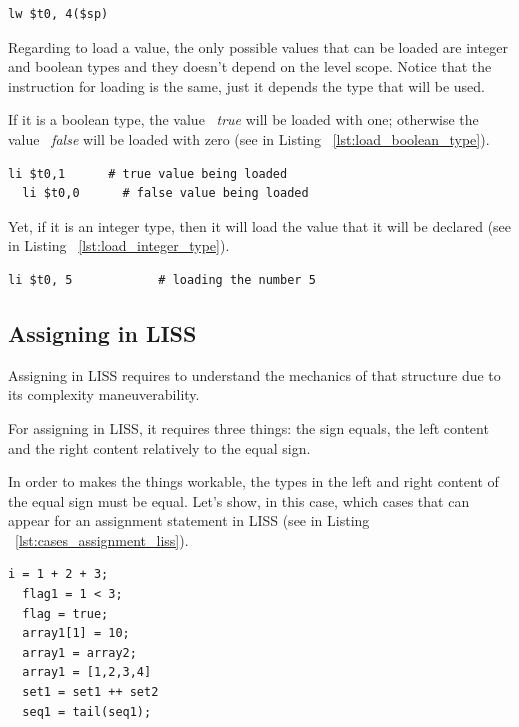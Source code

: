 \documentclass[
  oneside,
  11pt, a4paper,
  footinclude=true,
  headinclude=true,
  cleardoublepage=empty
]{scrbook}
\begin{document}
\begin{lstlisting}[caption={Loading a variable with level scope greater than zero},label={lst:load_variable_level_scope_great_0}]
  lw $t0, 4($sp)
\end{lstlisting}

Regarding to load a value, the only possible values that can be loaded are integer and boolean types and they doesn't depend on the level scope.
Notice that the instruction for loading is the same, just it depends the type that will be used.

If it is a boolean type, the value ~\textit{true} will be loaded with one; otherwise the value ~\textit{false} will be loaded with zero (see in Listing ~\ref{lst:load_boolean_type}).

\begin{lstlisting}[caption={Loading a boolean value},label={lst:load_boolean_type}]
  li $t0,1		# true value being loaded
  li $t0,0		# false value being loaded
\end{lstlisting}

Yet, if it is an integer type, then it will load the value that it will be declared (see in Listing ~\ref{lst:load_integer_type}).

\begin{lstlisting}[caption={Loading an integer value},label={lst:load_integer_type}]
  li $t0, 5            # loading the number 5
\end{lstlisting}

\subsection{Assigning in LISS}

Assigning in LISS requires to understand the mechanics of that structure due to its complexity maneuverability.

For assigning in LISS, it requires three things: the sign equals, the left content and the right content relatively to the equal sign.

In order to makes the things workable, the types in the left and right content of the equal sign must be equal.
Let's show, in this case, which cases that can appear for an assignment statement in LISS (see in Listing ~\ref{lst:cases_assignment_liss}).

\begin{lstlisting}[caption={Examples of assignment for different types in LISS},label={lst:cases_assignment_liss}]
  i = 1 + 2 + 3;
  flag1 = 1 < 3;
  flag = true;
  array1[1] = 10;
  array1 = array2;
  array1 = [1,2,3,4]
  set1 = set1 ++ set2
  seq1 = tail(seq1);
\end{lstlisting}
\end{document}
